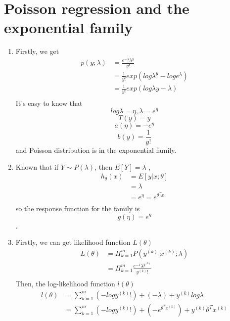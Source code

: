 \documentclass[12pt]{article}
\begin{document}
    \newpage
    \section*{ Poisson regression and the exponential family}

    \begin{enumerate}[label=(\alph*)]

    \item 
    Firstly, we get 
    \begin{equation*} 
        \begin{split}
            p(y;\lambda) &= \frac{e^{-\lambda}\lambda^{y}}{y!} \\
            &= \frac{1}{y!}exp(log\lambda^y - loge^\lambda) \\
            &= \frac{1}{y!}exp(log\lambda y - \lambda) \\
    \end{split}
    \end{equation*} 
    It's easy to know that
    $$ log\lambda = \eta, \lambda = e^\eta $$
    $$ T(y) = y $$
    $$ a(\eta) = -e^\eta $$
    $$ b(y) = \frac{1}{y!} $$
    and Poisson distribution is in the exponential family.

    \item 
    Known that if $ Y \sim P(\lambda) $, then $ E[Y] = \lambda $ ,
    \begin{equation*} 
        \begin{split}
            h_\theta(x) &= E[y|x;\theta] \\
                        &= \lambda \\
                        &= e^\eta = e^{\theta^Tx} \\
        \end{split}
    \end{equation*} 
    so the response function for the family is 
    $$ g(\eta) = e^\eta $$.

    \item 
    Firstly, we can get likelihood function $L(\theta)$
    \begin{equation*} 
        \begin{split}
            L(\theta) &= \Pi_{k=1}^m P(y^{(k)}|x^{(k)};\lambda) \\
                      &= \Pi_{k=1}^m \frac{e^{-\lambda}\lambda^{y^{(k)}}}{y^{(k)}!} \\
        \end{split}
    \end{equation*} 
    Then, the log-likelihood function $l(\theta)$
    \begin{equation*} 
        \begin{split}
            l(\theta) 
            &= \sum_{k=1}^m (-logy^{(k)}!) + (-\lambda) + y^{(k)}log\lambda \\
            &= \sum_{k=1}^m (-logy^{(k)}!) + (-e^{\theta^Tx^{(k)}}) + y^{(k)}\theta^Tx^{(k)} \\
        \end{split}
    \end{equation*} 


\end{enumerate}
\end{document}
